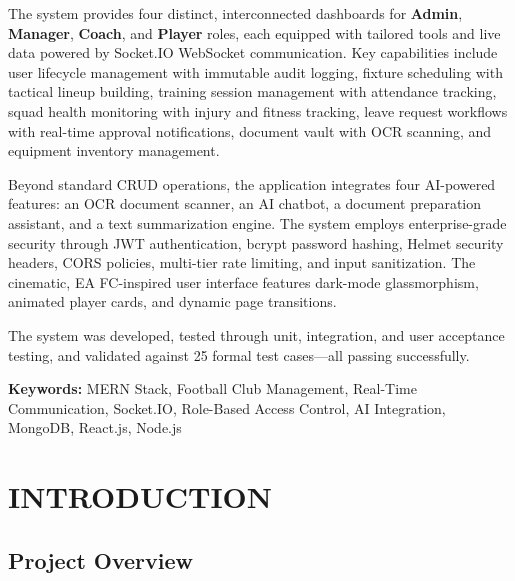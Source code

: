 \documentclass[12pt,a4paper,oneside]{report}
\begin{document}
The system provides four distinct, interconnected dashboards for \textbf{Admin}, \textbf{Manager}, \textbf{Coach}, and \textbf{Player} roles, each equipped with tailored tools and live data powered by Socket.IO WebSocket communication. Key capabilities include user lifecycle management with immutable audit logging, fixture scheduling with tactical lineup building, training session management with attendance tracking, squad health monitoring with injury and fitness tracking, leave request workflows with real-time approval notifications, document vault with OCR scanning, and equipment inventory management.

Beyond standard CRUD operations, the application integrates four AI-powered features: an OCR document scanner, an AI chatbot, a document preparation assistant, and a text summarization engine. The system employs enterprise-grade security through JWT authentication, bcrypt password hashing, Helmet security headers, CORS policies, multi-tier rate limiting, and input sanitization. The cinematic, EA FC-inspired user interface features dark-mode glassmorphism, animated player cards, and dynamic page transitions.

The system was developed, tested through unit, integration, and user acceptance testing, and validated against 25 formal test cases---all passing successfully.

\vspace{0.5cm}
\noindent\textbf{Keywords:} MERN Stack, Football Club Management, Real-Time Communication, Socket.IO, Role-Based Access Control, AI Integration, MongoDB, React.js, Node.js

\newpage
\tableofcontents

\newpage
\listoffigures

\newpage
\listoftables

\newpage
{}
\setcounter{page}{1}

\chapter{INTRODUCTION}

\section{Project Overview}
\end{document}
